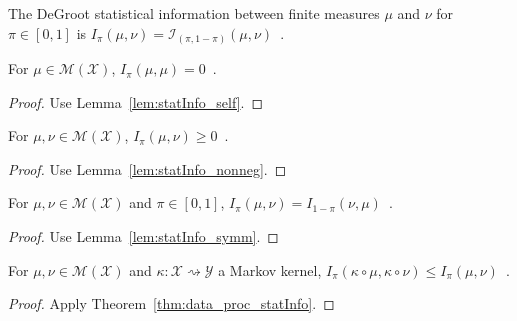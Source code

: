\begin{definition}
  \label{def:deGrootInfo}
  \leanok
  The DeGroot statistical information between finite measures $\mu$ and $\nu$ for $\pi \in [0,1]$ is $I_\pi(\mu, \nu) = \mathcal I_{(\pi, 1 - \pi)}(\mu, \nu)$~.
\end{definition}

\begin{lemma}
  \label{lem:deGrootInfo_self}
  \leanok
  For $\mu \in \mathcal M(\mathcal X)$, $I_\pi(\mu, \mu) = 0$~.
\end{lemma}

\begin{proof}%
{}
Use Lemma~\ref{lem:statInfo_self}.
\end{proof}

\begin{lemma}
  \label{lem:deGrootInfo_nonneg}
  For $\mu, \nu \in \mathcal M(\mathcal X)$, $I_\pi(\mu, \nu) \ge 0$~.
\end{lemma}

\begin{proof}%
{}
Use Lemma~\ref{lem:statInfo_nonneg}.
\end{proof}

\begin{lemma}
  \label{lem:deGrootInfo_symm}
  For $\mu, \nu \in \mathcal M(\mathcal X)$ and $\pi \in [0,1]$, $I_\pi(\mu, \nu) = I_{1 - \pi}(\nu, \mu)$~.
\end{lemma}

\begin{proof}%
{}
Use Lemma~\ref{lem:statInfo_symm}.
\end{proof}

\begin{theorem}
  \label{thm:data_proc_deGrootInfo}
  \leanok
  For $\mu, \nu \in \mathcal M(\mathcal X)$ and $\kappa : \mathcal X \rightsquigarrow \mathcal Y$ a Markov kernel, $I_\pi(\kappa \circ \mu, \kappa \circ \nu) \le I_\pi(\mu, \nu)$~.
\end{theorem}

\begin{proof}\leanok
{}
Apply Theorem~\ref{thm:data_proc_statInfo}.
\end{proof}


